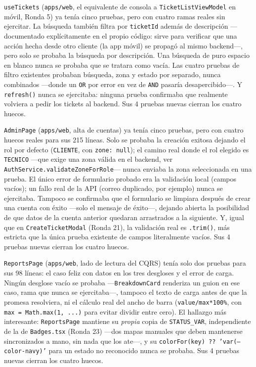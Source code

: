 \texttt{useTickets} (\texttt{apps/web}, el equivalente de consola a \texttt{TicketListViewModel}
en móvil, Ronda 5) ya tenía cinco pruebas, pero con cuatro ramas reales sin ejercitar. La
búsqueda también filtra por \texttt{ticketId} además de descripción —documentado explícitamente
en el propio código: sirve para verificar que una acción hecha desde otro cliente (la app móvil)
se propagó al mismo backend—, pero solo se probaba la búsqueda por descripción. Una búsqueda de
puro espacio en blanco nunca se probaba que se tratara como vacía. Las cuatro pruebas de filtro
existentes probaban búsqueda, zona y estado por separado, nunca combinados —donde un \texttt{OR}
por error en vez de \texttt{AND} pasaría desapercibido—. Y \texttt{refresh()} nunca se
ejercitaba: ninguna prueba confirmaba que realmente volviera a pedir los tickets al backend. Sus
4 pruebas nuevas cierran los cuatro huecos.

\texttt{AdminPage} (\texttt{apps/web}, alta de cuentas) ya tenía cinco pruebas, pero con cuatro
huecos reales para sus 215 líneas. Solo se probaba la creación exitosa dejando el rol por
defecto (\texttt{CLIENTE}, con \texttt{zone: null}); el camino real donde el rol elegido es
\texttt{TECNICO} —que exige una zona válida en el backend, ver
\texttt{AuthService.validateZoneForRole}— nunca enviaba la zona seleccionada en una prueba. El
único error de formulario probado era la validación local (campos vacíos); un fallo real de la
API (correo duplicado, por ejemplo) nunca se ejercitaba. Tampoco se confirmaba que el formulario
se limpiara después de crear una cuenta con éxito —solo el mensaje de éxito—, dejando abierta la
posibilidad de que datos de la cuenta anterior quedaran arrastrados a la siguiente. Y, igual que
en \texttt{CreateTicketModal} (Ronda 21), la validación real es \texttt{.trim()}, más estricta
que la única prueba existente de campos literalmente vacíos. Sus 4 pruebas nuevas cierran los
cuatro huecos.

\texttt{ReportsPage} (\texttt{apps/web}, lado de lectura del CQRS) tenía solo dos pruebas para
sus 98 líneas: el caso feliz con datos en los tres desgloses y el error de carga. Ningún
desglose vacío se probaba —\texttt{BreakdownCard} renderiza un guion en ese caso, rama que nunca
se ejercitaba—, tampoco el texto de carga antes de que la promesa resolviera, ni el cálculo real
del ancho de barra (\texttt{value/max*100\%}, con \texttt{max = Math.max(1, ...)} para evitar
dividir entre cero). El hallazgo más interesante: \texttt{ReportsPage} mantiene su \emph{propia}
copia de \texttt{STATUS\_VAR}, independiente de la de \texttt{Badges.tsx} (Ronda 23) —dos mapas
manuales que deben mantenerse sincronizados a mano, sin nada que los ate—, y su
\texttt{colorFor(key) ?? 'var(--color-navy)'} para un estado no reconocido nunca se probaba. Sus
4 pruebas nuevas cierran los cuatro huecos.


